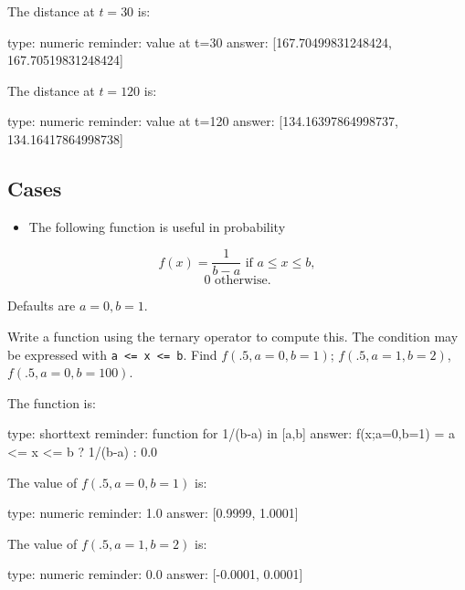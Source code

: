 \documentclass[12pt]{article}
\begin{document}
The distance at $t=30$ is:

\begin{answer}
    type: numeric
    reminder: value at t=30
    answer: [167.70499831248424, 167.70519831248424]

\end{answer}

The distance at $t=120$ is:

\begin{answer}
    type: numeric
    reminder: value at t=120
    answer: [134.16397864998737, 134.16417864998738]

\end{answer}

\subsection{Cases}

\begin{itemize}
\itemsep1pt\parskip0pt
\item
  The following function is useful in probability
\end{itemize}

\[
f(x)= \frac{1}{b-a} \text{ if } a \leq x \leq b, 
\] \[
0  \text{ otherwise.}
\]

Defaults are $a=0, b=1$.

Write a function using the ternary operator to compute this. The
condition may be expressed with
\texttt{a \textless{}= x \textless{}= b}. Find $f(.5, a=0, b=1)$;
$f(.5, a=1, b=2)$, $f(.5,a=0, b=100)$.

The function is:

\begin{answer}
type: shorttext
reminder: function for 1/(b-a) in [a,b]
answer: f(x;a=0,b=1) = a <= x <= b ? 1/(b-a) : 0.0

\end{answer}

The value of $f(.5, a=0, b=1)$ is:

\begin{answer}
    type: numeric
    reminder: 1.0
    answer: [0.9999, 1.0001]

\end{answer}

The value of $f(.5, a=1, b=2)$ is:

\begin{answer}
    type: numeric
    reminder: 0.0
    answer: [-0.0001, 0.0001]

\end{answer}
\end{document}
